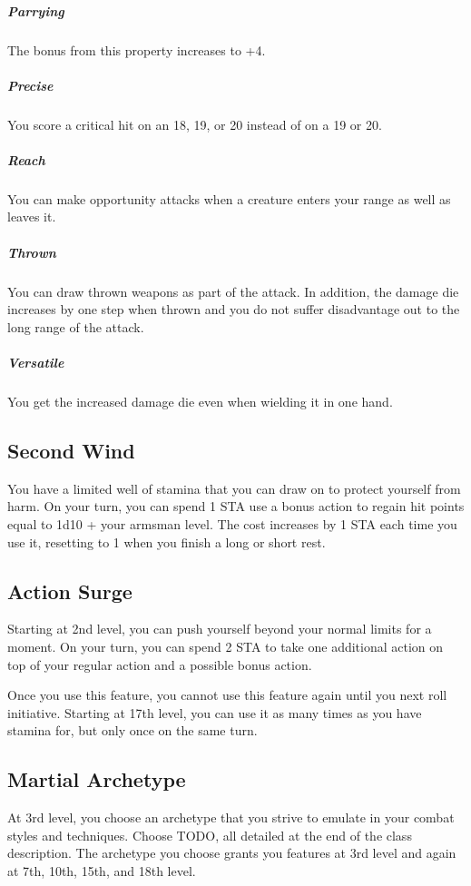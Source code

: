 \subparagraph*{Parrying} The bonus from this property increases to +4.

\subparagraph*{Precise} You score a critical hit on an 18, 19, or 20 instead of on a 19 or 20.

\subparagraph*{Reach} You can make opportunity attacks when a creature enters your range as well as leaves it.

\subparagraph*{Thrown} You can draw thrown weapons as part of the attack. In addition, the damage die increases by one step when thrown and you do not suffer disadvantage out to the long range of the attack.

\subparagraph*{Versatile} You get the increased damage die even when wielding it in one hand.

\subsection{Second Wind}

You have a limited well of stamina that you can draw on to protect yourself from harm. On your turn, you can spend 1 STA use a bonus action to regain hit points equal to 1d10 + your armsman level. The cost increases by 1 STA each time you use it, resetting to 1 when you finish a long or short rest.

\subsection{Action Surge}

Starting at 2nd level, you can push yourself beyond your normal limits for a moment. On your turn, you can spend 2 STA to take one additional action on top of your regular action and a possible bonus action.

Once you use this feature, you cannot use this feature again until you next roll initiative. Starting at 17th level, you can use it as many times as you have stamina for, but only once on the same turn.

\subsection{Martial Archetype}

At 3rd level, you choose an archetype that you strive to emulate in your combat styles and techniques. Choose TODO, all detailed at the end of the class description. The archetype you choose grants you features at 3rd level and again at 7th, 10th, 15th, and 18th level.

